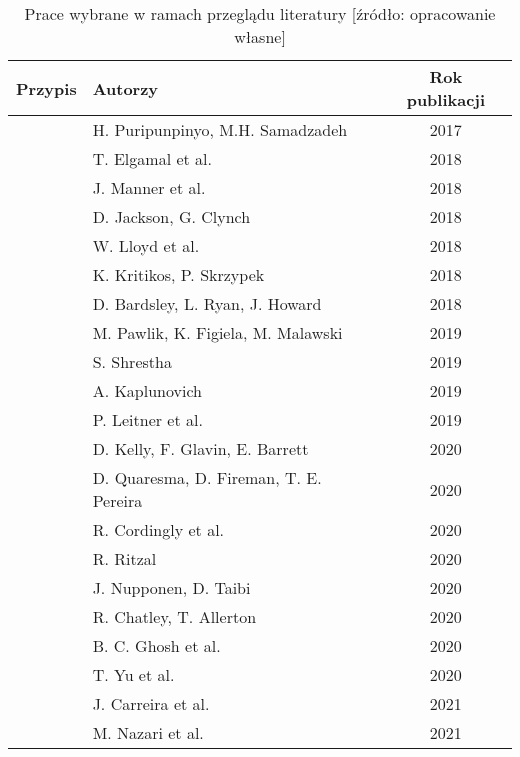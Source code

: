 \begin{table}[!ht]
    \caption{Prace wybrane w ramach przeglądu literatury [źródło: opracowanie własne]}
    \centering
    \begin{tabular}{|c|l|c|}
    \hline
    \textbf{Przypis} & \textbf{Autorzy} & \textbf{Rok publikacji} \\
    \hline
    \cite{8116416} & H. Puripunpinyo, M.H. Samadzadeh & 2017 \\
    \hline
    \cite{8567674} & T. Elgamal et al. & 2018 \\
    \hline
    \cite{8605777} & J. Manner et al. & 2018 \\
    \hline
    \cite{8605773} & D. Jackson, G. Clynch & 2018 \\
    \hline
    \cite{8605779} & W. Lloyd et al. & 2018 \\
    \hline
    \cite{8605774} & K. Kritikos, P. Skrzypek & 2018 \\
    \hline
    \cite{8513710} & D. Bardsley, L. Ryan, J. Howard & 2018 \\
    \hline
    \cite{pawlik2019performanceconsiderationsexecutionlarge} & M. Pawlik, K. Figiela, M. Malawski & 2019 \\
    \hline
    \cite{shrestha2019lambda} & S. Shrestha & 2019 \\
    \hline
    \cite{8844428} & A. Kaplunovich & 2019 \\
    \hline
    \cite{LEITNER2019340} & P. Leitner et al. & 2019 \\
    \hline
    \cite{9284261} & D. Kelly, F. Glavin, E. Barrett & 2020 \\
    \hline
    \cite{9235063} & D. Quaresma, D. Fireman, T. E. Pereira & 2020 \\
    \hline
    \cite{Cordingly2020704} & R. Cordingly et al. & 2020 \\
    \hline
    \cite{ritzal2020optimizing} & R. Ritzal & 2020 \\
    \hline
    \cite{9095731} & J. Nupponen, D. Taibi & 2020 \\
    \hline
    \cite{10.1145/3377812.3382135} & R. Chatley, T. Allerton & 2020 \\
    \hline
    \cite{9027427} & B. C. Ghosh et al. & 2020 \\
    \hline
    \cite{10.1145/3419111.3421280} & T. Yu et al. & 2020 \\
    \hline
    \cite{10.1145/3458336.3465305} & J. Carreira et al. & 2021 \\
    \hline
    \cite{9732138} & M. Nazari et al. & 2021 \\

\end{tabular}
\end{table}
